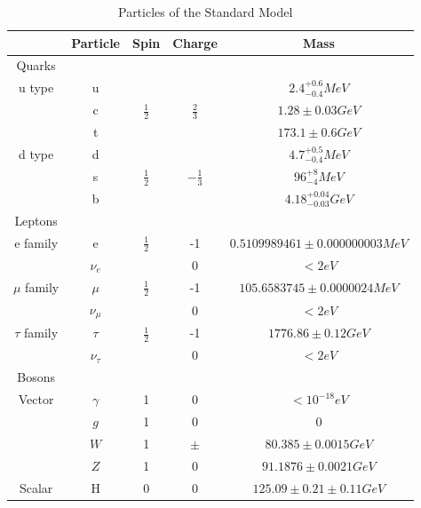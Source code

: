 \begin{table}[h]
\begin{center}
\footnotesize
\begin{tabular}[h]{|c||c|c|c|c|}
\hline
 & Particle & Spin & Charge & Mass \\
\hline\hline
Quarks &&&&\\
\hline
u type &u& & &${2.4^{+0.6}_{-0.4} MeV}$\\
 &c&${\frac{1}{2}}$&${\frac{2}{3}}$&${1.28\pm{0.03} GeV}$\\
 &t& & &${173.1\pm{0.6} GeV}$\\
\hline
d type & d& & & ${4.7^{+0.5}_{-0.4} MeV}$\\
 & s & ${\frac{1}{2}}$ & ${-\frac{1}{3}}$ & ${96^{+8}_{-4} MeV}$\\
 & b & & & ${4.18^{+0.04}_{-0.03} GeV}$\\
\hline\hline
Leptons &&&&\\
\hline
e family & e & ${\frac{1}{2}}$ & -1 &${0.5109989461\pm{}0.000000003 MeV}$\\
 & ${\nu_{e}}$ & & 0 & ${< 2 eV}$\\
 \hline
${\mu}$ family & ${\mu}$ & ${\frac{1}{2}}$ & -1 &${105.6583745\pm{}0.0000024 MeV}$\\
 & ${\nu_{\mu}}$ & & 0 & ${< 2 eV}$\\
 \hline
${\tau}$ family & ${\tau}$ & ${\frac{1}{2}}$ & -1 &${1776.86\pm{}0.12 GeV}$\\
 & ${\nu_{\tau}}$ & & 0 & ${< 2 eV}$\\
 \hline\hline
 Bosons &&&&\\
 \hline
 Vector & ${\gamma}$ & 1 & 0 & ${< 10^{-18} eV}$\\
 & ${g}$ & 1 & 0 & ${0}$\\
 & ${W}$ & 1 & ${\pm}$ & ${80.385\pm{}0.0015 GeV}$\\
 & ${Z}$ & 1 & 0 & ${91.1876\pm{}0.0021 GeV}$\\
 \hline
 Scalar & H & 0& 0 & ${125.09\pm{}0.21\pm{}0.11 GeV}$\\
 \hline
\end{tabular}
\caption[Particles of the Standard Model]{Particles of the Standard Model ~\cite{PhysRevD.98.030001}}
\label{tab:SM}
\end{center}
\end{table}

